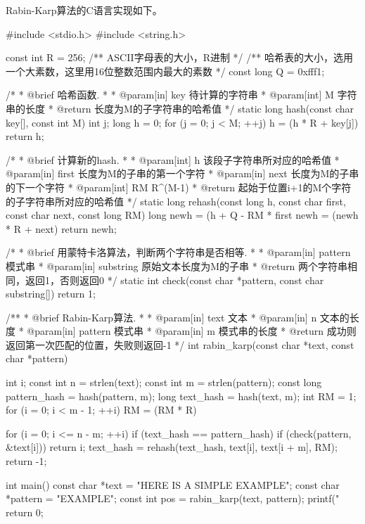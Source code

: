 Rabin-Karp算法的C语言实现如下。
\begin{Codex}[label=rabin_karp.c]
#include <stdio.h>
#include <string.h>

const int R = 256;  /** ASCII字母表的大小，R进制 */
/** 哈希表的大小，选用一个大素数，这里用16位整数范围内最大的素数 */
const long Q = 0xfff1;

/*
 * @brief 哈希函数.
 *
 * @param[in] key 待计算的字符串
 * @param[int] M 字符串的长度
 * @return 长度为M的子字符串的哈希值
 */
static long hash(const char key[], const int M) {
    int j;
    long h = 0;
    for (j = 0; j < M; ++j) h = (h * R + key[j]) %
    return h;
}

/*
 * @brief 计算新的hash.
 *
 * @param[int] h 该段子字符串所对应的哈希值
 * @param[in] first 长度为M的子串的第一个字符
 * @param[in] next 长度为M的子串的下一个字符
 * @param[int] RM R^(M-1) %
 * @return 起始于位置i+1的M个字符的子字符串所对应的哈希值
 */
static long rehash(const long h, const char first, const char next,
                   const long RM) {
    long newh = (h + Q - RM * first %
    newh = (newh * R + next) %
    return newh;
}

/*
 * @brief 用蒙特卡洛算法，判断两个字符串是否相等.
 *
 * @param[in] pattern 模式串
 * @param[in] substring 原始文本长度为M的子串
 * @return 两个字符串相同，返回1，否则返回0
 */
static int check(const char *pattern, const char substring[]) {
    return 1;
}

/**
 * @brief Rabin-Karp算法.
 *
 * @param[in] text 文本
 * @param[in] n 文本的长度
 * @param[in] pattern 模式串
 * @param[in] m 模式串的长度
 * @return 成功则返回第一次匹配的位置，失败则返回-1
 */
int rabin_karp(const char *text, const char *pattern) {
    int i;
    const int n = strlen(text);
    const int m = strlen(pattern);
    const long pattern_hash = hash(pattern, m);
    long text_hash = hash(text, m);
    int RM = 1;
    for (i = 0; i < m - 1; ++i) RM = (RM * R) %

    for (i = 0; i <= n - m; ++i) {
        if (text_hash == pattern_hash) {
            if (check(pattern, &text[i])) return i;
        }
        text_hash = rehash(text_hash, text[i], text[i + m], RM);
    }
    return -1;
}


int main() {
    const char *text = "HERE IS A SIMPLE EXAMPLE";
    const char *pattern = "EXAMPLE";
    const int pos = rabin_karp(text, pattern);
    printf("%
    return 0;
}
\end{Codex}

